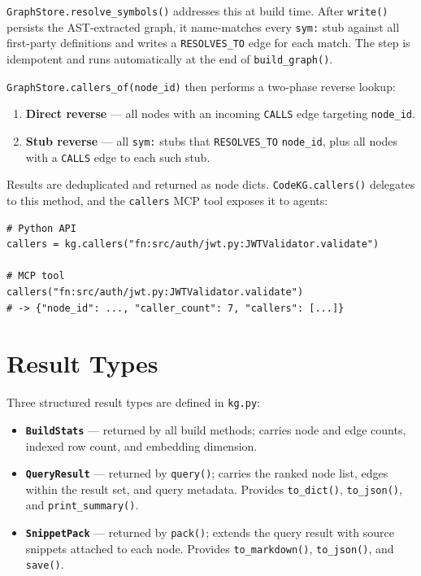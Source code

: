 \documentclass[10pt]{article}
\begin{document}
\texttt{GraphStore.resolve\_sym\-bols()} addresses this at build time. After
\texttt{write()} persists the AST-extracted graph, it name-matches every
\texttt{sym:} stub against all first-party definitions and writes a
\texttt{RESOLVES\_TO} edge for each match. The step is idempotent and runs
automatically at the end of \texttt{build\_graph()}.

\texttt{GraphStore.callers\_of(node\_id)} then performs a two-phase reverse lookup:

\begin{enumerate}
\item \textbf{Direct reverse} --- all nodes with an incoming \texttt{CALLS}
edge targeting \texttt{node\_id}.
\item \textbf{Stub reverse} --- all \texttt{sym:} stubs that \texttt{RESOLVES\_TO}
\texttt{node\_id}, plus all nodes with a \texttt{CALLS} edge to each such stub.
\end{enumerate}

Results are deduplicated and returned as node dicts. \texttt{CodeKG.callers()}
delegates to this method, and the \texttt{callers} MCP tool exposes it to agents:

\begin{lstlisting}
# Python API
callers = kg.callers("fn:src/auth/jwt.py:JWTValidator.validate")

# MCP tool
callers("fn:src/auth/jwt.py:JWTValidator.validate")
# -> {"node_id": ..., "caller_count": 7, "callers": [...]}
\end{lstlisting}

\section{Result Types}

Three structured result types are defined in \texttt{kg.py}:

\begin{itemize}
\item \textbf{\texttt{BuildStats}} --- returned by all build methods; carries node
and edge counts, indexed row count, and embedding dimension.
\item \textbf{\texttt{QueryResult}} --- returned by \texttt{query()}; carries the
ranked node list, edges within the result set, and query metadata. Provides
\texttt{to\_dict()}, \texttt{to\_json()}, and \texttt{print\_summary()}.
\item \textbf{\texttt{SnippetPack}} --- returned by \texttt{pack()}; extends the
query result with source snippets attached to each node. Provides
\texttt{to\_markdown()}, \texttt{to\_json()}, and \texttt{save()}.
\end{itemize}
\end{document}
